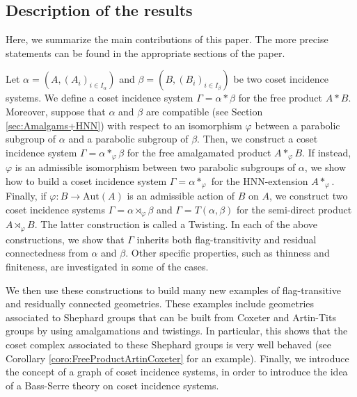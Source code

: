 \documentclass[11pt,letterpaper]{amsart}
\newenvironment{red}{\relax\color{red}}{\hspace*{.5ex}\relax}
\newcommand{\bcp}{\begin{red} }
\newcommand{\ecp}{\end{red}}
\newcommand{\Aut}{\mathrm{Aut}}
\begin{document}
\subsection{Description of the results}
Here, we summarize the main contributions of this paper. The more precise statements can be found in the appropriate sections of the paper.

Let $\alpha = (A,(A_i)_{i \in I_\alpha})$ and $\beta = (B,(B_i)_{i \in I_\beta})$ be two coset incidence systems. We define a coset incidence system $\Gamma =\alpha * \beta$ for the free product $A * B$. Moreover, suppose that $\alpha$ and $\beta$ are compatible (see Section \ref{sec:Amalgams+HNN}) with respect to an isomorphism $\varphi$ between a parabolic subgroup of $\alpha$ and a parabolic subgroup of $\beta$. Then, we construct a coset incidence system $\Gamma = \alpha *_\varphi \beta$ for the free amalgamated product $A *_\varphi B$. If instead, $\varphi$ is an admissible isomorphism between two parabolic subgroups of $\alpha$, we show how to build a coset incidence system $\Gamma = \alpha *_\varphi$ for the HNN-extension $A *_\varphi$. Finally, if $\varphi \colon B \to \Aut(A)$ is an admissible action of $B$ on $A$, we construct two coset incidence systems $\Gamma = \alpha \rtimes_\varphi \beta$ and $\Gamma = T(\alpha,\beta)$ for the semi-direct product $A \rtimes_\varphi B$. The latter construction is called a Twisting. 
In each of the above constructions, we show that $\Gamma$ inherits both flag-transitivity and residual connectedness from $\alpha$ and $\beta$. Other specific properties, such as thinness and finiteness, are investigated in some of the cases.

We then use these constructions to build many new examples of flag-transitive and residually connected geometries. These examples include geometries associated to Shephard groups that can be built from Coxeter and Artin-Tits groups by using amalgamations and twistings. In particular, this shows that the coset complex associated to these Shephard groups is very well behaved (see Corollary \ref{coro:FreeProductArtinCoxeter} for an example). 
Finally, we introduce the concept of a graph of coset incidence systems, in order to introduce the idea of a Bass-Serre theory on coset incidence systems.
\end{document}
